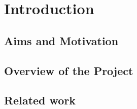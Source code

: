 
	
	\chapter{Introduction}
	
	\section{Aims and Motivation}  \label{1.1}
	
	\section{Overview of the Project}\label{1.2}
	
	\section{Related work}
	
	\subsection{}
	
	\subsection{}

